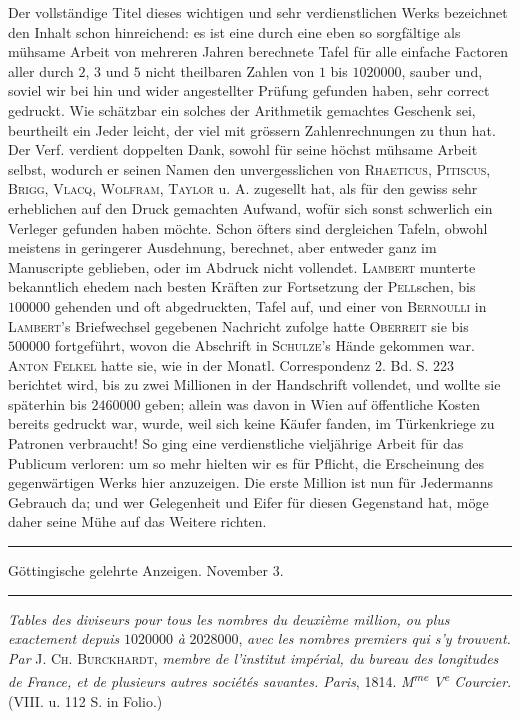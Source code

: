 Der vollständige Titel dieses wichtigen und sehr verdienstlichen Werks bezeichnet den Inhalt schon hinreichend: es ist eine durch eine eben so sorgfältige als mühsame Arbeit von mehreren Jahren berechnete Tafel für alle einfache Factoren aller durch $2$, $3$ und $5$ nicht theilbaren Zahlen von $1$ bis $1020000$, sauber und, soviel wir bei hin und wider angestellter Prüfung gefunden haben, sehr correct gedruckt. Wie schätzbar ein solches der Arithmetik gemachtes Geschenk sei, beurtheilt ein Jeder leicht, der viel mit grössern Zahlenrechnungen zu thun hat. Der Verf. verdient doppelten Dank, sowohl für seine höchst mühsame Arbeit selbst, wodurch er seinen Namen den unvergesslichen von \textsc{Rhaeticus}, \textsc{Pitiscus}, \textsc{Brigg}, \textsc{Vlacq}, \textsc{Wolfram}, \textsc{Taylor} u. A. zugesellt hat, als für den gewiss sehr erheblichen auf den Druck gemachten Aufwand, wofür sich sonst schwerlich ein Verleger gefunden haben möchte. Schon öfters sind dergleichen Tafeln, obwohl meistens in geringerer Ausdehnung, berechnet, aber entweder ganz im Manuscripte geblieben, oder im Abdruck nicht vollendet. \textsc{Lambert} munterte bekanntlich ehedem nach besten Kräften zur Fortsetzung der \textsc{Pell}schen, bis $100000$ gehenden und oft abgedruckten, Tafel auf, und einer von \textsc{Bernoulli} in \textsc{Lambert}'s Briefwechsel gegebenen Nachricht zufolge hatte \textsc{Oberreit} sie bis $500000$ fortgeführt, wovon die Abschrift in \textsc{Schulze}'s Hände gekommen war. \textsc{Anton Felkel} hatte sie, wie in der Monatl. Correspondenz 2. Bd. S. 223 berichtet wird, bis zu zwei Millionen in der Handschrift vollendet, und wollte sie späterhin bis $2460000$ geben; allein was davon in Wien auf öffentliche Kosten bereits gedruckt war, wurde, weil sich keine Käufer fanden, im Türkenkriege zu Patronen verbraucht! So ging eine verdienstliche vieljährige Arbeit für das Publicum verloren: um so mehr hielten wir es für Pflicht, die Erscheinung des gegenwärtigen Werks hier anzuzeigen. Die erste Million ist nun für Jedermanns Gebrauch da; und wer Gelegenheit und Eifer für diesen Gegenstand hat, möge daher seine Mühe auf das Weitere richten.

%
\begin{center}
\rule{.86\linewidth}{.3pt}\par
Göttingische gelehrte Anzeigen. November 3.\par
\rule{.86\linewidth}{.3pt}
\end{center}
\emph{Tables des diviseurs pour tous les nombres du deuxième million, ou plus exactement depuis} $1020000$ \emph{à} $2028000$, \emph{avec les nombres premiers qui s'y trouvent. Par} \textsc{J. Ch. Burckhardt}, \emph{membre de l'institut impérial, du bureau des longitudes de France, et de plusieurs autres sociétés savantes. Paris}, 1814. \emph{M\textsuperscript{me} V\textsuperscript{e} Courcier}. (VIII. u. 112 S. in Folio.)

